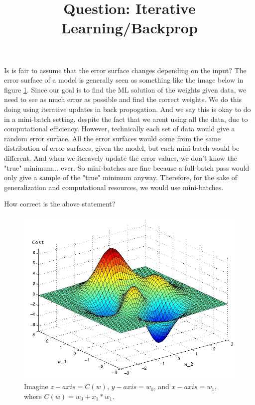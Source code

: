 \documentclass[11pt]{article}
\title{Question: Iterative Learning/Backprop}
\author{}
\date{}
\begin{document}
\maketitle
\tableofcontents

Is is fair to assume that the error surface changes depending on the input? The error surface of a model is generally seen as something like the image below in figure \ref{fig:error_surface}. Since our goal is to find the ML solution of the weights given data, we need to see as much error as possible and find the correct weights. We do this doing using iterative updates in back propogation. And we say this is okay to do in a mini-batch setting, despite the fact that we arent using all the data, due to computational efficiency. However, technically each set of data would give a random error surface. All the error surfaces would come from the same distribution of error surfaces, given the model, but each mini-batch would be different. And when we iteravely update the error values, we don't know the "true" minimum... ever. So mini-batches are fine because a full-batch pass would only give a sample of the "true" minimum anyway. Therefore, for the sake of generalization and computational resources, we would use mini-batches.

How correct is the above statement?

  \begin{figure}[H]
    \includegraphics[width=0.5\linewidth]{error_plot}
    \caption{Imagine $z-axis = C(w)$, $y-axis = w_{0}$, and $x-axis = w_{1}$, where $C(w) = w_{0} + x_{1} * w_{1} $.}
    \label{fig:error_surface}
  \end{figure}
\end{document}
